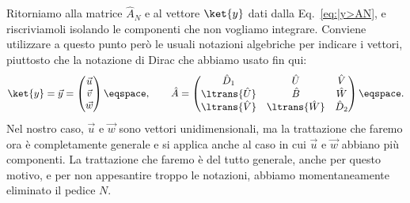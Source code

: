 Ritorniamo alla matrice $\hat{A}_{N}$ e  al vettore $\ket{y}$ dati dalla
Eq.~\eqref{eq:|y>AN}, e riscriviamoli isolando le componenti
che non vogliamo integrare. Conviene utilizzare a questo punto per\`o le usuali
 notazioni algebriche per indicare i vettori, piuttosto che la notazione di
Dirac che abbiamo usato fin qui:
\begin{displaymath}
\ket{y} = \vec{y} =  \begin{pmatrix} \vec{u} \\ \vec{v} \\ \vec{w} \end{pmatrix}
\eqspace ,  \qquad 
\hat{A}  = 
\begin{pmatrix} 
\hat{D}_{1}      & \hat{U}          & \hat{V} \\
\ltrans{\hat{U}} & \hat{B}          & \hat{W} \\
\ltrans{\hat{V}} & \ltrans{\hat{W}} & \hat{D}_{2}
\end{pmatrix} \eqspace .
\end{displaymath}
Nel nostro caso,  $\vec{u} $ e $\vec{w}$ sono vettori  unidimensionali, ma la
trattazione che faremo ora \`e completamente generale e si applica anche al caso
in cui $\vec{u}$ e $\vec{w}$ abbiano pi\`u componenti.  La trattazione che
faremo \`e del tutto generale, anche per questo motivo,
e per non appesantire troppo le notazioni, abbiamo momentaneamente eliminato il
 pedice $N$.

